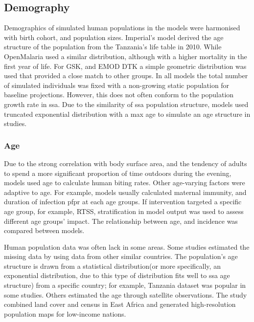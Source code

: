 \documentclass[a4paper, 12pt, twoside]{report}
\begin{document}
\subsection{Demography}
Demographics of simulated human populations in the models were harmonised with birth cohort, and population sizes.
Imperial's model derived the age structure of the population from the Tanzania's life table in 2010.
While OpenMalaria used a similar distribution, although with a higher mortality in the first year of life.
For GSK, and EMOD DTK a simple geometric distribution was used that provided a close match to other groups.
In all models the total number of simulated individuals was fixed with a non-growing static population for baseline projections.
However, this does not often conform to the population growth rate in \gls{ssa}.
Due to the similarity of \gls{ssa} population structure, models used truncated exponential distribution with a max age to simulate an age structure in studies\cite{White2018b}.

\subsubsection{Age}
Due to the strong correlation with body surface area, and the tendency of adults to spend a more significant proportion of time outdoors during the evening, models used age to calculate human biting rates.
Other age-varying factors were adaptive to age.
For example, models usually calculated maternal immunity, and duration of infection \gls{pfpr} at each age groups.
If intervention targeted a specific age group, for example, RTSS, stratification in model output was used to assess different age groups' impact.
The relationship between age, and incidence was compared between models.

Human population data was often lack in some areas.
Some studies estimated the missing data by using data from other similar countries.
The population's age structure is drawn from a statistical distribution(or more specifically, an exponential distribution, due to this type of distribution fits well to \gls{ssa} age structure) from a specific country; for example, Tanzania dataset\cite{Sherrard-Smith2018b} was popular in some studies.
Others\cite{Adimi2010} estimated the age through satellite observations.
The study combined land cover and census in East Africa and generated high-resolution population maps for low-income nations.
\end{document}
